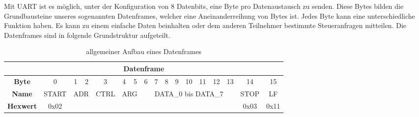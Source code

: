 Mit UART ist es möglich, unter der Konfiguration von 8 Datenbits, eine Byte pro Datenaustausch zu senden. Diese Bytes bilden die Grundbausteine unseres sogenannten Datenframes, welcher eine Aneinanderreihung von Bytes ist. Jedes Byte
kann eine unterschiedliche Funktion haben. Es kann zu einem einfache Daten beinhalten oder dem anderen Teilnehmer bestimmte Steueranfragen mitteilen. Die Datenframes sind in folgende Grundstruktur aufgeteilt.

\begin{table}[h]
    \centering
    \begin{tabular}{|c|c|c|c|c|c|c|c|c|c|c|c|c|c|c|c|c|}
    \hline
    \multicolumn{17}{|c|}{\textbf{Datenframe}}                                                                                                             \\ \hline
    \textbf{Byte}     & 0     & 1           & 2          & 3    & 4           & 5          & 6  & 7  & 8  & 9  & 10  & 11  & 12  & 13 & 14   & 15   \\ \hline
    \textbf{Name}            & START & \multicolumn{2}{c|}{ADR} & CTRL & \multicolumn{2}{c|}{ARG} & \multicolumn{8}{c|}{DATA\_0 bis DATA\_7} & STOP & LF   \\ \hline
    \textbf{Hexwert}    	 & 0x02  &             &            &      &             &            & \multicolumn{8}{c|}{}                    & 0x03 & 0x11 \\ \hline
    \end{tabular}
    \caption{allgemeiner Aufbau eines Datenframes}
\end{table}

